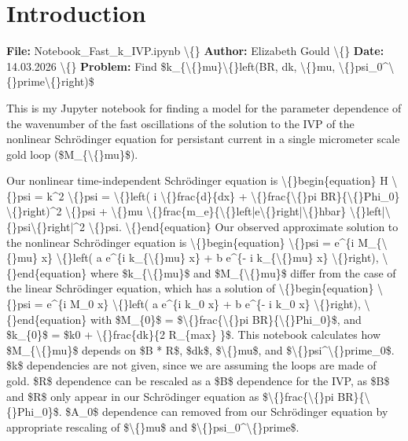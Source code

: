 \documentclass{article}
\begin{document}
\section{Introduction}


\textbf{File:} Notebook\_Fast\_k\_IVP.ipynb 
\textbackslash\{\}
\textbf{Author:} Elizabeth Gould
\textbackslash\{\}
\textbf{Date:} 14.03.2026
\textbackslash\{\}
\textbf{Problem:} Find \$k\_\{\textbackslash\{\}mu\}\textbackslash\{\}left(BR, dk, \textbackslash\{\}mu, \textbackslash\{\}psi\_0\textasciicircum{}\textbackslash\{\}prime\textbackslash\{\}right)\$

This is my Jupyter notebook for finding a model for the parameter dependence of the wavenumber of the fast oscillations of the solution to the IVP of the nonlinear Schr\"{o}dinger equation for persistant current in a single micrometer scale gold loop (\$M\_\{\textbackslash\{\}mu\}\$). 

Our nonlinear time-independent Schr\"{o}dinger equation is
\textbackslash\{\}begin\{equation\}
H \textbackslash\{\}psi = k\textasciicircum{}2 \textbackslash\{\}psi = \textbackslash\{\}left( i \textbackslash\{\}frac\{d\}\{dx\} + \textbackslash\{\}frac\{\textbackslash\{\}pi BR\}\{\textbackslash\{\}Phi\_0\} \textbackslash\{\}right)\textasciicircum{}2 \textbackslash\{\}psi + \textbackslash\{\}mu \textbackslash\{\}frac\{m\_e\}\{\textbackslash\{\}left|e\textbackslash\{\}right|\textbackslash\{\}hbar\} \textbackslash\{\}left|\textbackslash\{\}psi\textbackslash\{\}right|\textasciicircum{}2 \textbackslash\{\}psi.
\textbackslash\{\}end\{equation\}
Our observed approximate solution to the nonlinear Schr\"{o}dinger equation is
\textbackslash\{\}begin\{equation\}
\textbackslash\{\}psi = e\textasciicircum{}\{i M\_\{\textbackslash\{\}mu\} x\} \textbackslash\{\}left( a e\textasciicircum{}\{i k\_\{\textbackslash\{\}mu\} x\} + b e\textasciicircum{}\{- i k\_\{\textbackslash\{\}mu\} x\} \textbackslash\{\}right),
\textbackslash\{\}end\{equation\}
where \$k\_\{\textbackslash\{\}mu\}\$ and \$M\_\{\textbackslash\{\}mu\}\$ differ from the case of the linear Schr\"{o}dinger equation, which has a solution of
\textbackslash\{\}begin\{equation\}
\textbackslash\{\}psi = e\textasciicircum{}\{i M\_0 x\} \textbackslash\{\}left( a e\textasciicircum{}\{i k\_0 x\} + b e\textasciicircum{}\{- i k\_0 x\} \textbackslash\{\}right),
\textbackslash\{\}end\{equation\}
with \$M\_\{0\}\$ = \$\textbackslash\{\}frac\{\textbackslash\{\}pi BR\}\{\textbackslash\{\}Phi\_0\}\$, and \$k\_\{0\}\$ = \$k0 + \textbackslash\{\}frac\{dk\}\{2  R\_\{max\} \}\$. This notebook calculates how \$M\_\{\textbackslash\{\}mu\}\$ depends on \$B * R\$, \$dk\$, \$\textbackslash\{\}mu\$, and \$\textbackslash\{\}psi\textasciicircum{}\textbackslash\{\}prime\_0\$. \$k\$ dependencies are not given, since we are assuming the loops are made of gold. \$R\$ dependence can be rescaled as a \$B\$ dependence for the IVP, as \$B\$ and \$R\$ only appear in our Schr\"{o}dinger equation as \$\textbackslash\{\}frac\{\textbackslash\{\}pi BR\}\{\textbackslash\{\}Phi\_0\}\$. \$A\_0\$ dependence can removed from our Schr\"{o}dinger equation by appropriate rescaling of \$\textbackslash\{\}mu\$ and \$\textbackslash\{\}psi\_0\textasciicircum{}\textbackslash\{\}prime\$.
\end{document}
